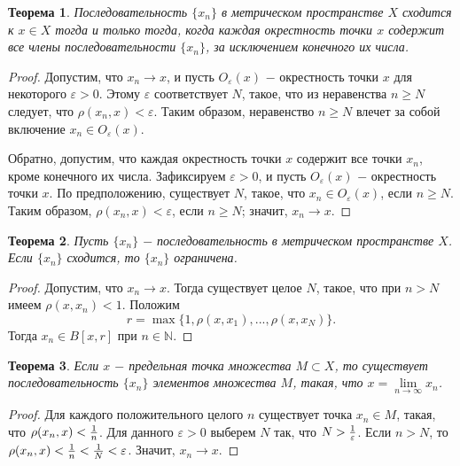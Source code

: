 \documentclass{article}
\newtheorem{theorem}{Теорема}[section]
\begin{document}
\begin{theorem}
Последовательность \(\{x_n\}\) в метрическом пространстве \(X\) сходится к \(x \in X\) тогда и только тогда, когда каждая окрестность точки \(x\) содержит все члены последовательности \(\{x_n\}\), за исключением конечного их числа.
\end{theorem}

\begin{proof}
Допустим, что \(x_n \to x\), и пусть \(O_\varepsilon(x)\) \(-\) окрестность точки \(x\) для некоторого \(\varepsilon > 0\). Этому \(\varepsilon\) соответствует \(N\), такое, что из неравенства \(n \geq N\) следует, что \(\rho(x_n, x) < \varepsilon\). Таким образом, неравенство \(n \geq N\) влечет за собой включение \(x_n \in O_\varepsilon(x)\).

Обратно, допустим, что каждая окрестность точки \(x\) содержит все точки \(x_n\), кроме конечного их числа. Зафиксируем \(\varepsilon > 0\), и пусть \(O_\varepsilon(x)\) \(-\) окрестность точки \(x\). По предположению, существует \(N\), такое, что \(x_n \in O_\varepsilon(x)\), если \(n \geq N\). Таким образом, \(\rho(x_n, x) < \varepsilon\), если \(n \geq N\); значит, \(x_n \to x\).
\end{proof}

\begin{theorem}
Пусть \(\{x_n\}\) \(-\) последовательность в метрическом пространстве \(X\). Если \(\{x_n\}\) сходится, то \(\{x_n\}\) ограничена.
\end{theorem}

\begin{proof}
Допустим, что \(x_n \to x\). Тогда существует целое \(N\), такое, что при \(n > N\) имеем \(\rho(x, x_n) < 1\). Положим
\[
r = \max\{1, \rho(x, x_1), ..., \rho(x, x_N)\}.
\]
Тогда \(x_n \in B[x, r]\) при \(n \in \mathbb{N}\).
\end{proof}

\begin{theorem}
Если \(x\) \(-\) предельная точка множества \(M \subset X\), то существует последовательность \(\{x_n\}\) элементов множества \(M\), такая, что \(x = \lim\limits_{n \to \infty} x_n\).
\end{theorem}

\begin{proof}
Для каждого положительного целого \(n\) существует точка \(x_n \in M\), такая, что \(\rho(x_n, x) < {{1} \over {n}}\). Для данного \(\varepsilon > 0\) выберем \(N\) так, что \(N > {1 \over \varepsilon}\). Если \(n > N\), то \(\rho(x_n, x) < {1 \over n} < {1 \over N} < \varepsilon\). Значит, \(x_n \to x\).
\end{proof}
\end{document}
